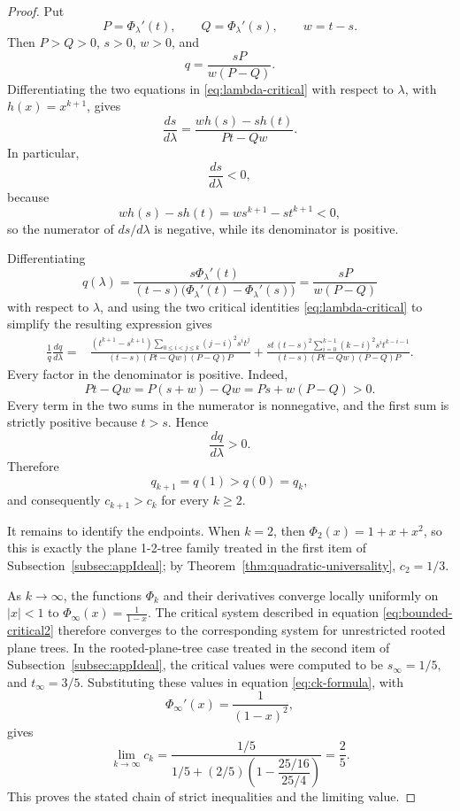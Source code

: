 \documentclass[10pt,a4paper]{amsart}
\theoremstyle{remark}
\begin{document}
\begin{proof}
Put
\[
P=\Phi_\lambda'(t),
\qquad
Q=\Phi_\lambda'(s),
\qquad
w=t-s.
\]
Then $P>Q>0$, $s>0$, $w>0$, and
\[
q=\frac{sP}{w(P-Q)}.
\]
Differentiating the two equations in \eqref{eq:lambda-critical} with respect to $\lambda$, with $h(x)=x^{k+1}$, gives
\[
\frac{ds}{d\lambda}
=
\frac{w h(s)-s h(t)}{Pt-Qw}.
\]
In particular,
\[
\frac{ds}{d\lambda}<0,
\]
because
\[
w h(s)-s h(t)
=w s^{k+1}-s t^{k+1}<0,
\] so the numerator of $ds/d\lambda$ is negative, while its denominator is positive. 

Differentiating
\[
q(\lambda)=
\frac{s\Phi_\lambda'(t)}
{(t-s)\bigl(\Phi_\lambda'(t)-\Phi_\lambda'(s)\bigr)}
=
\frac{sP}{w(P-Q)}
\]
with respect to $\lambda$, and using the two critical identities
\eqref{eq:lambda-critical} to simplify the resulting expression gives
\begin{align}
\label{eq:qderivative-positive}
\frac1q\frac{dq}{d\lambda}
={}&
\frac{
(t^{k+1}-s^{k+1})
\displaystyle\sum_{0\le i<j\le k}(j-i)^2s^it^j
}
{(t-s)(Pt-Qw)(P-Q)P}
+
\frac{
s t\,(t-s)^2
\displaystyle\sum_{i=0}^{k-1}(k-i)^2s^it^{k-i-1}
}
{(t-s)(Pt-Qw)(P-Q)P}.
\end{align}
Every factor in the denominator is positive.  Indeed,
\[
Pt-Qw=P(s+w)-Qw=Ps+w(P-Q)>0.
\]
Every term in the two sums in the numerator is nonnegative, and the first sum is strictly positive because $t>s$.  Hence
\[
\frac{dq}{d\lambda}>0.
\]
Therefore
\[
q_{k+1}=q(1)>q(0)=q_k,
\]
and consequently $c_{k+1}>c_k$ for every $k\ge2$.

It remains to identify the endpoints.  When $k=2$,
then
$\Phi_2(x)=1+x+x^2$,
so this is exactly the plane 1-2-tree family treated in the first item of Subsection~\ref{subsec:appIdeal}; by Theorem~\ref{thm:quadratic-universality},
$
c_2=1/3.
$ 

As $k\to\infty$, the functions $\Phi_k$ and their derivatives converge locally uniformly on $|x|<1$ to
$
\Phi_\infty(x)=\frac1{1-x}.
$
The critical system described in equation \eqref{eq:bounded-critical2} therefore converges to the corresponding system for unrestricted rooted plane trees.  In the rooted-plane-tree case treated in the second item of Subsection~\ref{subsec:appIdeal}, the critical values were computed to be
$
s_\infty=1/5,
$ and
$t_\infty=3/5.
$
Substituting these values in equation \eqref{eq:ck-formula}, with
\[
\Phi_\infty'(x)=\frac1{(1-x)^2},
\]
gives
\[
\lim_{k\to\infty}c_k
=
\frac{1/5}
{1/5+(2/5)\left(1-\dfrac{25/16}{25/4}\right)}
=\frac25.
\]
This proves the stated chain of strict inequalities and the limiting value.
\end{proof}
\end{document}
